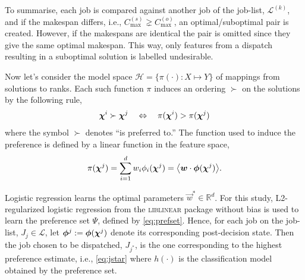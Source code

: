 \documentclass[smallextended]{svjour3}
\begin{document}
To summarise, each job is compared against another job of the job-list, 
$\mathcal{L}^{(k)}$, and if the makespan differs, i.e., $C_{\max}^{(s)}\gneq 
C_{\max}^{(o)}$, an optimal/suboptimal pair is created. 
However, if the makespans are identical the pair is omitted since they give the 
same optimal makespan. 
This way, only features from a dispatch resulting in a suboptimal solution is 
labelled undesirable.

Now let's consider the model space $\mathcal{H} = \{\pi(\cdot) : X \mapsto Y\}$ 
of mappings from solutions to ranks. Each such 
function $\pi$ induces an ordering $\succ$ on the solutions  by the following 
rule,
\begin{equation}\label{eq:linear}
\bm \chi^i \succ \bm \chi^j \quad \Leftrightarrow \quad \pi(\bm \chi^i) > 
\pi(\bm \chi^j)
\end{equation}
where the symbol $\succ$ denotes ``is preferred to.''  The function used to 
induce the preference is defined by a linear function in the feature space,
\begin{equation} 
\pi(\vchi^j)=\sum_{i=1}^d w_i\phi_i(\vchi^j)=\inner{\vec{w}}{\vphi(\vchi^j)}.
\end{equation}

Logistic regression learns the optimal parameters $\vec{w}^*\in\mathbb{R}^d$. 
For this study, L2-regularized logistic regression from the \textsc{liblinear} 
package \cite{liblinear} without bias is used to learn the preference set 
$\Psi$, defined by \cref{eq:prefset}.
Hence, for each job on the job-list, $J_j\in\mathcal{L}$, let 
$\bm{\phi}^j:=\bm{\phi}(\bm \chi^j)$ denote its corresponding  post-decision state. 
Then the job chosen to be dispatched, $J_{j^*}$, is the one corresponding to 
the highest preference estimate, i.e., \cref{eq:jstar} where $h(\cdot)$ is the 
classification model obtained by the preference set.
\end{document}
